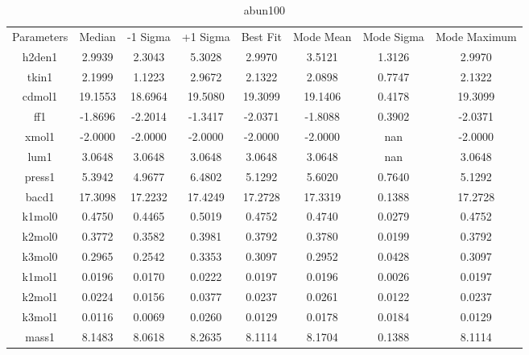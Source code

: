 \begin{table}
\caption{abun100}
\begin{tabular}{cccccccc}
Parameters & Median & -1 Sigma & +1 Sigma & Best Fit & Mode Mean & Mode Sigma & Mode Maximum \\
h2den1 & 2.9939 & 2.3043 & 5.3028 & 2.9970 & 3.5121 & 1.3126 & 2.9970 \\
tkin1 & 2.1999 & 1.1223 & 2.9672 & 2.1322 & 2.0898 & 0.7747 & 2.1322 \\
cdmol1 & 19.1553 & 18.6964 & 19.5080 & 19.3099 & 19.1406 & 0.4178 & 19.3099 \\
ff1 & -1.8696 & -2.2014 & -1.3417 & -2.0371 & -1.8088 & 0.3902 & -2.0371 \\
xmol1 & -2.0000 & -2.0000 & -2.0000 & -2.0000 & -2.0000 & nan & -2.0000 \\
lum1 & 3.0648 & 3.0648 & 3.0648 & 3.0648 & 3.0648 & nan & 3.0648 \\
press1 & 5.3942 & 4.9677 & 6.4802 & 5.1292 & 5.6020 & 0.7640 & 5.1292 \\
bacd1 & 17.3098 & 17.2232 & 17.4249 & 17.2728 & 17.3319 & 0.1388 & 17.2728 \\
k1mol0 & 0.4750 & 0.4465 & 0.5019 & 0.4752 & 0.4740 & 0.0279 & 0.4752 \\
k2mol0 & 0.3772 & 0.3582 & 0.3981 & 0.3792 & 0.3780 & 0.0199 & 0.3792 \\
k3mol0 & 0.2965 & 0.2542 & 0.3353 & 0.3097 & 0.2952 & 0.0428 & 0.3097 \\
k1mol1 & 0.0196 & 0.0170 & 0.0222 & 0.0197 & 0.0196 & 0.0026 & 0.0197 \\
k2mol1 & 0.0224 & 0.0156 & 0.0377 & 0.0237 & 0.0261 & 0.0122 & 0.0237 \\
k3mol1 & 0.0116 & 0.0069 & 0.0260 & 0.0129 & 0.0178 & 0.0184 & 0.0129 \\
mass1 & 8.1483 & 8.0618 & 8.2635 & 8.1114 & 8.1704 & 0.1388 & 8.1114 \\
\end{tabular}
\end{table}
